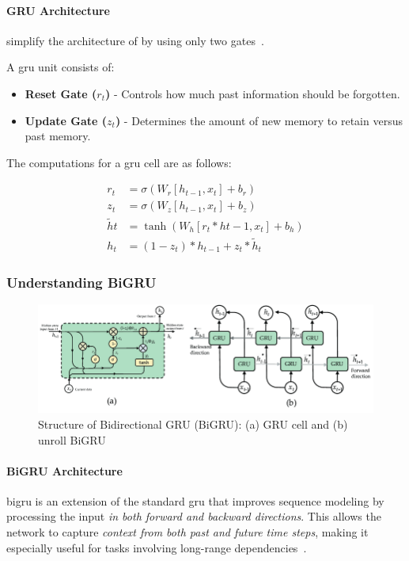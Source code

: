 \paragraph{GRU Architecture}  simplify the architecture of  by using only two 
gates~\parencite{chang2024StockPrediction}.

A \acrshort{gru} unit consists of:
\begin{itemize}
\item \textbf{Reset Gate ($r_t$)} - Controls how much past information should be forgotten.
\item \textbf{Update Gate ($z_t$)} - Determines the amount of new memory to retain versus past memory.
\end{itemize}

The computations for a \acrshort{gru} cell are as follows:

\begin{align}
r_t &= \sigma(W_r [h_{t-1}, x_t] + b_r) \\
z_t &= \sigma(W_z [h_{t-1}, x_t] + b_z) \\
\tilde{h}t &= \tanh(W_h [r_t * h{t-1}, x_t] + b_h) \\
h_t &= (1 - z_t) * h_{t-1} + z_t * \tilde{h}_t
\end{align}

\subsubsection{Understanding BiGRU}

\begin{figure}[H]
    \centering
    \caption{Structure of Bidirectional GRU (BiGRU): (a) GRU cell and (b) unroll BiGRU}
    \label{fig:bigru}
    \includegraphics[width=\textwidth]{img/sections/main/bigru.png}
\end{figure}

\paragraph{BiGRU Architecture} \acrfull{bigru} is an extension of the standard \acrshort{gru} that improves sequence 
modeling by processing the input \emph{in both forward and backward directions}. This allows the network to capture 
\emph{context from both past and future time steps}, making it especially useful for tasks involving 
long-range dependencies~\parencite{shaban2024SMPDL}.

